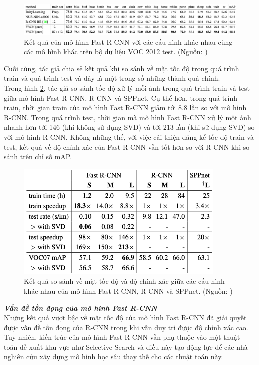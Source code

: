 {    \begin{figure}[H]
        \centering
        \includegraphics[width=15cm] {images/fast_rcnn_results_3}
        \caption{Kết quả của mô hình Fast R-CNN với các cấu hình khác nhau cùng các mô hình khác trên bộ dữ liệu VOC 2012 test. (Nguồn: \cite{girshick2015fast})}
        \label{fig:fast_rcnn_results_3}
    \end{figure}

    \noindent
    Cuối cùng, tác giả chia sẻ kết quả khi so sánh về mặt tốc độ trong quá trình train và quá trình test và đây là một trong số những thành quả chính. \\
    Trong hình \ref{fig:fast_rcnn_results_4}, tác giả so sánh tốc độ xử lý mỗi ảnh trong quá trình train và test giữa mô hình Fast R-CNN, R-CNN và SPPnet.
    Cụ thể hơn, trong quá trình train, thời gian train của mô hình Fast R-CNN giảm tới 8.8 lần so với mô hình R-CNN.
    Trong quá trình test, thời gian mà mô hình Fast R-CNN xử lý một ảnh nhanh hơn tới 146 (khi không sử dụng SVD) và tới 213 lần (khi sử dụng SVD) so với mô hình R-CNN.
    Không những thế, với việc cải thiện đáng kể tốc độ train và test, kết quả về độ chính xác của Fast R-CNN vẫn tốt hơn so với R-CNN khi so sánh trên chỉ số mAP.

    \begin{figure}[H]
        \centering
        \includegraphics[width=10cm] {images/fast_rcnn_results_4}
        \caption{Kết quả so sánh về mặt tốc độ và độ chính xác giữa các cấu hình khác nhau của mô hình Fast R-CNN, R-CNN và SPPnet. (Nguồn: \cite{girshick2015fast})}
        \label{fig:fast_rcnn_results_4}
    \end{figure}

    \noindent
    \textbf{\textit{Vấn đề tồn đọng của mô hình Fast R-CNN}} \\
    Những kết quả vượt bậc về mặt tốc độ của mô hình Fast R-CNN đã giải quyết được vấn đề tồn đọng của R-CNN trong khi vẫn duy trì được độ chính xác cao.
    Tuy nhiên, kiến trúc của mô hình Fast R-CNN vẫn phụ thuộc vào một thuật toán đề xuất khu vực như Selective Search và điều này tạo động lực để các nhà nghiên cứu xây dựng mô hình học sâu thay thế cho các thuật toán này.
}